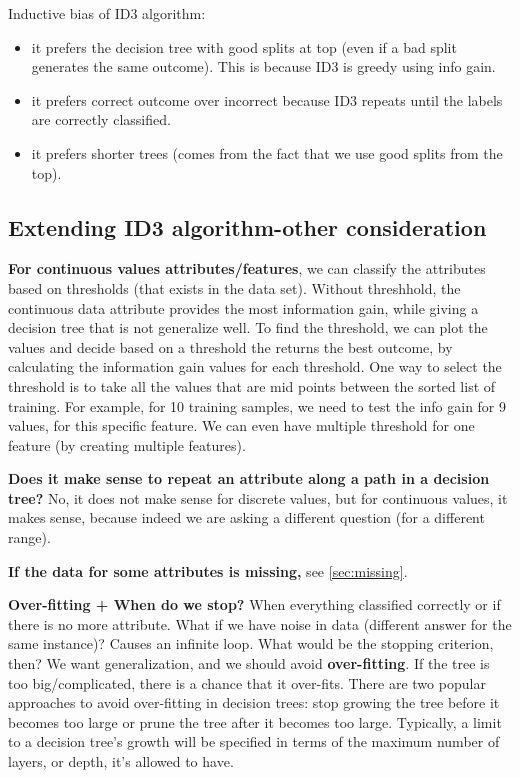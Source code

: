 \documentclass[12pt]{report}
\begin{document}
Inductive bias of ID3 algorithm:
\begin{itemize}
\item it prefers the decision tree with good splits at top (even if a bad split generates the same outcome). This is because ID3 is greedy using info gain.
\item it prefers correct outcome over incorrect because ID3 repeats until the labels are correctly classified.
\item it prefers shorter trees (comes from the fact that we use good splits from the top).
\end{itemize}

\subsection{Extending ID3 algorithm-other consideration}
\textbf{For continuous values attributes/features}, we can classify the attributes based on thresholds (that exists in the data set). Without threshhold, the continuous data attribute provides the most information gain, while giving a decision tree that is not generalize well. To find the threshold, we can plot the values and decide based on a threshold the returns the best outcome, by calculating the information gain values for each threshold. One way to select the threshold is to take all the values that are mid points between the sorted list of training. For example, for 10 training samples, we need to test the info gain for 9 values, for this specific feature. We can even have multiple threshold for one feature (by creating multiple features).

\textbf{Does it make sense to repeat an attribute along a path in a decision tree?} No, it does not make sense for discrete values, but for continuous values, it makes sense, because indeed we are asking a different question (for a different range).

\textbf{If the data for some attributes is missing,} see \ref{sec:missing}.

\textbf{Over-fitting + When do we stop?} When everything classified correctly or if there is no more attribute. What if we have noise in data (different answer for the same instance)? Causes an infinite loop. What would be the stopping criterion, then? We want generalization, and we should avoid \textbf{over-fitting}. If the tree is too big/complicated, there is a chance that it over-fits. There are two popular approaches to avoid over-fitting in decision trees: stop growing the tree before it becomes too large or prune the tree after it becomes too large. Typically, a limit to a decision tree’s growth will be specified in terms of the maximum number of layers, or depth, it’s allowed to have.
\end{document}
